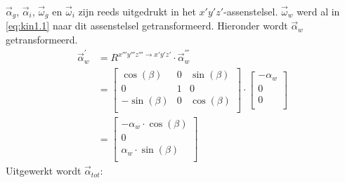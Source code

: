 $\vec{\alpha}_{g}$, $\vec{\alpha}_{i}$, $\vec{\omega}_{g}$ en $\vec{\omega}_{i}$ zijn reeds uitgedrukt in het $x'y'z'$-assenstelsel. $\vec{\omega}_{w}$ werd al in \eqref{eq:kin1.1} naar dit assenstelsel getransformeerd. Hieronder wordt $\vec{\alpha}_{w}$ getransformeerd.
\begin{equation}
\begin{split}
\vec{\alpha}_{w}^{'}&=R^{x'''y'''z''' \rightarrow x'y'z'} \cdot \vec{\alpha}_{w}^{'''}\\
&=\begin{bmatrix}
\cos(\beta)	&			0			&\sin(\beta)\\
0						&			1			&			0		 \\
-\sin(\beta)&			0			&\cos(\beta)\\
\end{bmatrix}
\cdot
\begin{bmatrix}
-\alpha_{w}	\\
0						\\
0						\\
\end{bmatrix}\\
&=
\begin{bmatrix}
-\alpha_{w}\cdot \cos(\beta)	\\
0						\\
\alpha_{w}\cdot \sin(\beta)	\\
\end{bmatrix}
\end{split}
\label{eq:kin1.7}
\end{equation}
Uitgewerkt wordt $\vec{\alpha}_{tot}$:
